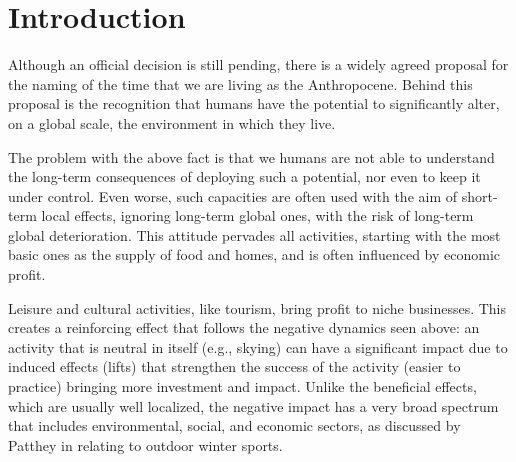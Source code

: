 \documentclass[sustainability,article,submit,pdftex,moreauthors]{Definitions/mdpi}
\begin{document}






\section{Introduction}

Although an official decision is still pending, there is a widely agreed proposal for the naming of the time that we are living as the Anthropocene.  Behind this proposal is the recognition that humans have the potential to significantly alter, on a global scale, the environment in which they live.

The problem with the above fact is that we humans are not able to understand the long-term consequences of deploying such a potential, nor even to keep it under control. Even worse, such capacities are often used with the aim of short-term local effects, ignoring long-term global ones, with the risk of long-term global deterioration. This attitude pervades all activities, starting with the most basic ones as the supply of food and homes, and is often influenced by economic profit.

Leisure and cultural activities, like tourism, bring profit to niche businesses. This creates a reinforcing effect that follows the negative dynamics seen above: an activity that is neutral in itself (e.g., skying) can have a significant impact due to induced effects (lifts) that strengthen the success of the activity (easier to practice) bringing more investment and impact. Unlike the beneficial effects, which are usually well localized, the negative impact has a very broad spectrum that includes environmental, social, and economic sectors, as discussed by Patthey in \cite{pat08a} relating to outdoor winter sports.
\end{document}
